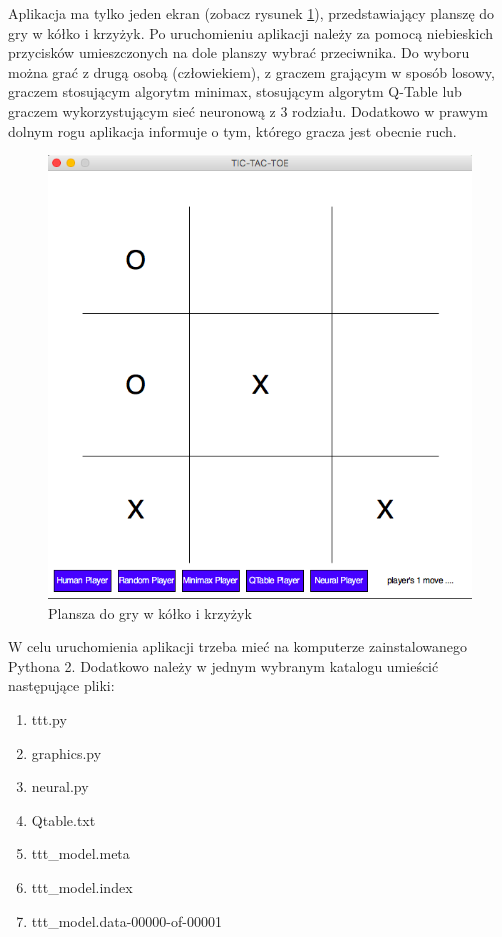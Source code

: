 \documentclass[licencjacka]{pracamgr}
\begin{document}
Aplikacja ma tylko jeden ekran (zobacz rysunek \ref{Rys34}), przedstawiający planszę do gry w kółko i krzyżyk. Po uruchomieniu aplikacji 
należy za pomocą niebieskich przycisków umieszczonych na dole planszy wybrać przeciwnika. Do wyboru można grać z drugą osobą (człowiekiem), 
z graczem grającym w sposób losowy,  graczem stosującym algorytm minimax, stosującym algorytm Q-Table lub graczem wykorzystującym sieć neuronową 
z 3 rodziału. Dodatkowo w prawym dolnym rogu aplikacja informuje o tym, którego gracza jest obecnie ruch.

\begin{figure}[h!]
	\includegraphics [scale=0.45] {plansza.png}
	\caption{Plansza do gry w kółko i krzyżyk}
	\label{Rys34}
\end{figure} 

W celu uruchomienia aplikacji trzeba mieć na komputerze zainstalowanego Pythona 2. Dodatkowo należy w jednym wybranym katalogu umieścić następujące 
pliki:
\begin{enumerate}
	\item{ttt.py}
	\item{graphics.py}
	\item{neural.py}
	\item{Qtable.txt}
	\item{ttt\_model.meta}
	\item{ttt\_model.index}
	\item{ttt\_model.data-00000-of-00001}
\end{enumerate}
\end{document}
